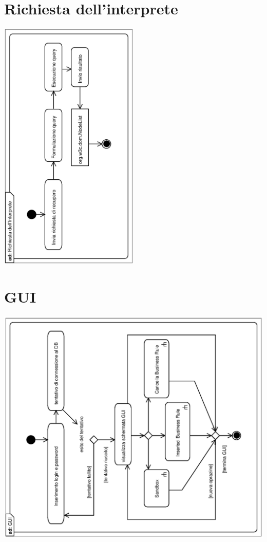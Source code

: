 \documentclass[11pt,titlepage,a4paper]{report}
\begin{document}
\section{Richiesta dell'interprete}

\begin{center}
 \includegraphics[width=0.5\textwidth, angle=-90]{RichiestadellInterprete.eps}
\end{center}


\section{GUI}

\begin{center}
 \includegraphics[width=1\textwidth, angle=-90]{GUI.eps}
\end{center}
\end{document}
